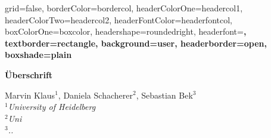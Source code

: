 \documentclass[a0paper,portrait]{baposter}
\begin{document}

\begin{poster}{
grid=false,
borderColor=bordercol, %
headerColorOne=headercol1, %
headerColorTwo=headercol2, %
headerFontColor=headerfontcol, %
boxColorOne=boxcolor, %
headershape=roundedright, %
headerfont=\Large\sf\bf, %
textborder=rectangle,
background=user,
headerborder=open, %
boxshade=plain
}

%
%
{ \bf  \huge {Überschrift} } %
{\vspace{0.3em} \smaller Marvin Klaus$^1$, Daniela Schacherer$^2$, Sebastian Bek$^3$  \\  %
  
\smaller $^1$\it {University of Heidelberg} \\ $^2$\it{Uni} \\ $^3$\it{..} %
  
 } %



\end{poster}
\end{document}

